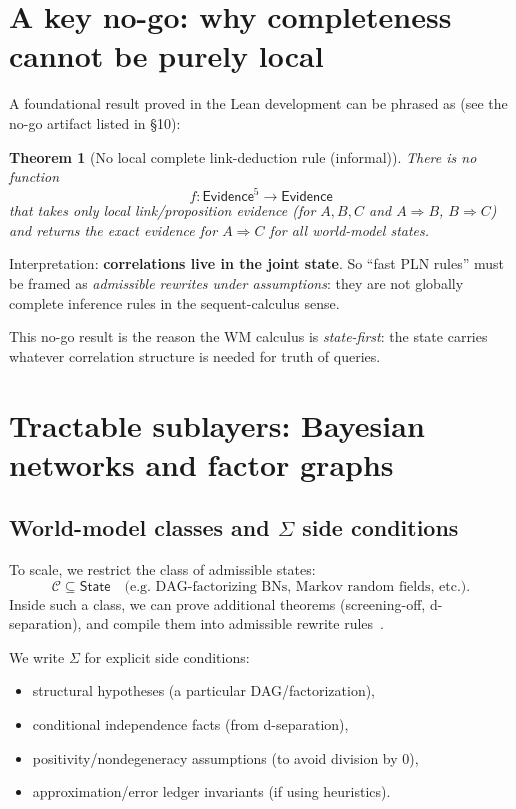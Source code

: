 \documentclass[11pt]{article}
\newtheorem{theorem}{Theorem}
\newcommand{\Evidence}{\mathsf{Evidence}}
\newcommand{\State}{\mathsf{State}}
\newcommand{\side}{\Sigma}
\begin{document}
\section{A key no-go: why completeness cannot be purely local}

A foundational result proved in the Lean development can be phrased as
(see the no-go artifact listed in \S10):

\begin{theorem}[No local complete link-deduction rule (informal)]
There is no function
\[
  f:\Evidence^5\to \Evidence
\]
that takes only \emph{local} link/proposition evidence (for $A,B,C$ and $A\Rightarrow B$, $B\Rightarrow C$)
and returns the \emph{exact} evidence for $A\Rightarrow C$ for \emph{all} world-model states.
\end{theorem}

Interpretation: \textbf{correlations live in the joint state}.
So ``fast PLN rules'' must be framed as \emph{admissible rewrites under assumptions}:
they are not globally complete inference rules in the sequent-calculus sense.

This no-go result is the reason the WM calculus is \emph{state-first}:
the state carries whatever correlation structure is needed for truth of queries.

\section{Tractable sublayers: Bayesian networks and factor graphs}

\subsection{World-model classes and $\Sigma$ side conditions}

To scale, we restrict the class of admissible states:
\[
  \mathcal{C} \subseteq \State \quad \text{(e.g.\ DAG-factorizing BNs, Markov random fields, etc.)}.
\]
Inside such a class, we can prove additional theorems (screening-off, d-separation),
and compile them into admissible rewrite rules~\cite{Pearl}.

We write $\side$ for explicit side conditions:
\begin{itemize}[leftmargin=2em]
\item structural hypotheses (a particular DAG/factorization),
\item conditional independence facts (from d-separation),
\item positivity/nondegeneracy assumptions (to avoid division by $0$),
\item approximation/error ledger invariants (if using heuristics).
\end{itemize}
\end{document}
